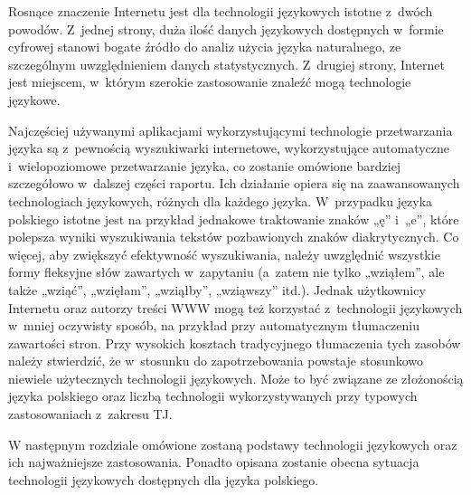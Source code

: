 \begin{multicols}{2}
Rosnące znaczenie Internetu jest dla technologii językowych istotne
z~dwóch powodów. Z~jednej strony, duża ilość danych językowych
dostępnych w~formie cyfrowej stanowi bogate źródło do analiz
użycia języka naturalnego, ze szczególnym uwzględnieniem danych
statystycznych. Z~drugiej strony, Internet jest miejscem, w~którym
szerokie zastosowanie znaleźć mogą technologie językowe. 

Najczęściej używanymi aplikacjami wykorzystującymi technologie
przetwarzania języka są z~pewnością wyszukiwarki internetowe,
wykorzystujące automatyczne i~wielopoziomowe przetwarzanie języka,
co zostanie omówione bardziej szczegółowo w~dalszej części
raportu. Ich działanie opiera się na zaawansowanych technologiach
językowych, różnych dla każdego języka. W~przypadku języka
polskiego istotne jest na przykład jednakowe traktowanie znaków
„ę” i~„e”, które polepsza wyniki wyszukiwania tekstów
pozbawionych znaków diakrytycznych. Co więcej, aby zwiększyć
efektywność wyszukiwania, należy uwzględnić wszystkie formy
fleksyjne słów zawartych w~zapytaniu (a~zatem nie tylko
„wziąłem”, ale także „wziąć”, „wzięłam”,
„wziąłby”, „wziąwszy” itd.). Jednak użytkownicy Internetu
oraz autorzy treści WWW mogą też korzystać z~technologii
językowych w~mniej oczywisty sposób, na przykład przy automatycznym
tłumaczeniu zawartości stron. Przy wysokich kosztach tradycyjnego
tłumaczenia tych zasobów należy stwierdzić, że w~stosunku do
zapotrzebowania powstaje stosunkowo niewiele użytecznych technologii
językowych. Może to być związane ze złożonością języka
polskiego oraz liczbą technologii wykorzystywanych przy typowych
zastosowaniach z~zakresu TJ. 

W następnym rozdziale omówione zostaną podstawy technologii
językowych oraz ich najważniejsze zastosowania. Ponadto opisana
zostanie obecna sytuacja technologii językowych dostępnych dla
języka polskiego. 

\end{multicols} 

\clearpage 



